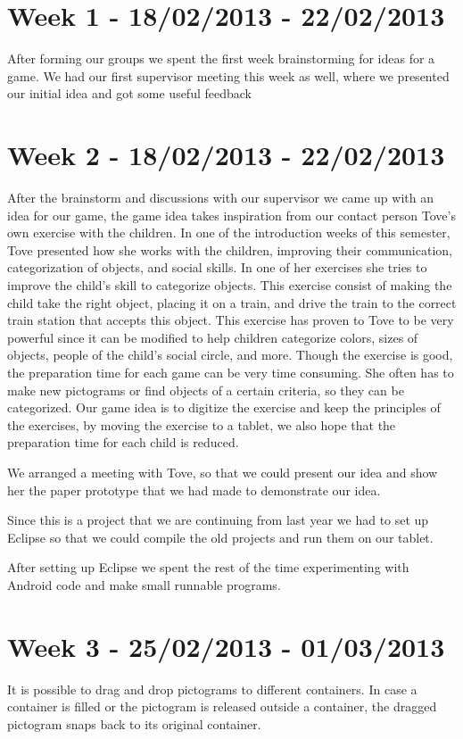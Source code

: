 \section*{Week 1 - 18/02/2013 - 22/02/2013}
After forming our groups we spent the first week brainstorming for ideas for a game. We had our first supervisor meeting this week as well, where we presented our initial idea and got some useful feedback

\section*{Week 2 - 18/02/2013 - 22/02/2013} 
\label{processweek2}
After the brainstorm and discussions with our supervisor we came up with an idea for our game, the game idea takes inspiration from our contact person Tove's own exercise with the children. In one of the introduction weeks of this semester, Tove presented how she works with the children, improving their communication, categorization of objects, and social skills. In one of her exercises she tries to improve the child's skill to categorize objects. This exercise consist of making the child take the right object, placing it on a train, and drive the train to the correct train station that accepts this object. This exercise has proven to Tove to be very powerful since it can be modified to help children categorize colors, sizes of objects, people of the child's social circle, and more. Though the exercise is good, the preparation time for each game can be very time consuming. She often has to make new pictograms or find objects of a certain criteria, so they can be categorized. Our game idea is to digitize the exercise and keep the principles of the exercises, by moving the exercise to a tablet, we also hope that the preparation time for each child is reduced.

We arranged a meeting with Tove, so that we could present our idea and show her the paper prototype that we had made to demonstrate our idea.%

Since this is a project that we are continuing from last year we had to set up Eclipse so that we could compile the old projects and run them on our tablet. 

After setting up Eclipse we spent the rest of the time experimenting with Android code and make small runnable programs. 

\section*{Week 3 - 25/02/2013 - 01/03/2013}
It is possible to drag and drop pictograms to different containers. In case a container is filled or the pictogram is released outside a container, the dragged pictogram snaps back to its original container.

